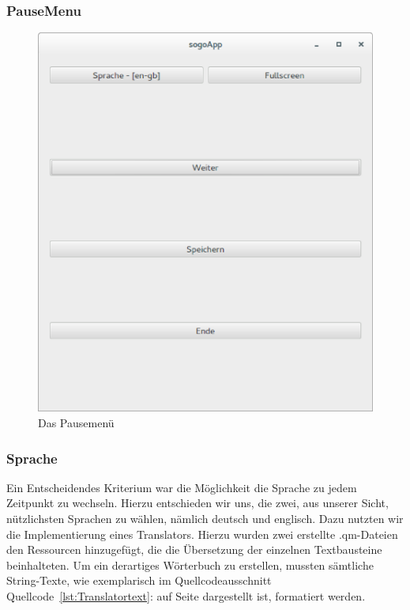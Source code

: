 \documentclass[a4paper]{scrartcl}
\begin{document}
\subsubsection{PauseMenu}\label{ch:PauseMenu}
\begin{figure}[H]
 \centering
 \includegraphics[scale=0.35]{graphics/pausemenu.eps}
 \caption{Das Pausemenü}
 \label{fig:Pausemenü}
\end{figure}

\subsubsection{Sprache}\label{ch:Sprache}
Ein Entscheidendes Kriterium war die Möglichkeit die Sprache zu jedem Zeitpunkt zu wechseln. Hierzu entschieden wir uns, die zwei, aus unserer Sicht, nützlichsten Sprachen zu wählen, nämlich deutsch und englisch. Dazu nutzten wir die Implementierung eines Translators. Hierzu wurden zwei erstellte .qm-Dateien den Ressourcen hinzugefügt, die die Übersetzung der einzelnen Textbausteine beinhalteten. Um ein derartiges Wörterbuch zu erstellen, mussten sämtliche String-Texte, wie exemplarisch im Quellcodeausschnitt Quellcode~\ref{lst:Translatortext}: auf Seite \pageref{lst:Translatortext} dargestellt ist, formatiert werden. 
\end{document}
